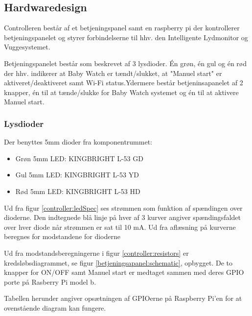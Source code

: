 \subsection*{Hardwaredesign}

Controlleren består af et betjeningspanel samt en raspberry pi der kontrollerer betjeningspanelet og styrer forbindelserne til hhv. den Intelligente Lydmonitor og Vuggesystemet.

Betjeningspanelet består som beskrevet af 3 lysdioder. Én grøn, én gul og én rød der hhv. indikerer at Baby Watch er tændt/slukket, at "Manuel start" er aktiveret/deaktiveret samt Wi-Fi status.Ydermere består betjeninsapanelet af 2 knapper, én til at tænde/slukke for Baby Watch systemet og én til at aktivere Manuel start.
 
\subsubsection*{Lysdioder}
Der benyttes 5mm dioder fra komponentrummet: 

\begin{itemize}
	\item Grøn 5mm LED: KINGBRIGHT L-53 GD
	\item Gul 5mm LED: KINGBRIGHT L-53 YD
	\item Rød 5mm LED: KINGBRIGHT L-53 HD
\end{itemize}



Ud fra figur \ref{controller:ledSpec} ses strømmen som funktion af spændingen over dioderne. Den indtegnede blå linje på hver af 3 kurver angiver spændingsfaldet over hver diode når strømmen er sat til 10 mA. Ud fra aflæsning på kurverne beregnes for modstandene for dioderne


Ud fra modstandsberegningerne i figur \ref{controller:resistors} er kredsløbsdiagrammet, se figur \ref{betjeningsapanel:schematic}, opbygget. De to knapper for ON/OFF samt Manuel start er medtaget sammen med deres GPIO porte på Rasberry Pi model b.


Tabellen herunder angiver opsætningen af GPIOerne på Raspberry Pi'en for at ovenstående diagram kan fungere.

